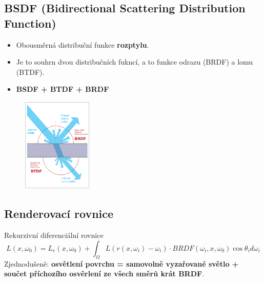 \subsection{BSDF (Bidirectional Scattering Distribution Function)}
\begin{itemize}
	\item Obousměrná distribuční funkce \textbf{rozptylu}.
	\item Je to souhrn dvou distribučních fukncí, a to funkce odrazu (BRDF) a lomu (BTDF).
	\item \textbf{BSDF + BTDF + BRDF}
\end{itemize}
\begin{figure}[H]
\centering
\includegraphics[width=0.3\textwidth]{assets/6_bsdf}
\end{figure}


\subsection{Renderovací rovnice}
Rekurzivní diferenciální rovnice
\begin{equation*}
	L(x, \omega_0) = L_e(x,\omega_0) + \int_{\Omega} L(r(x,\omega_i) - \omega_i) \cdot BRDF(\omega_i,x,\omega_0) \cos{\theta_id\omega_i}
\end{equation*}
Zjednodušeně: \textbf{osvětlení povrchu = samovolně vyzařované světlo + součet příchozího osvěrlení ze všech směrů krát BRDF}.